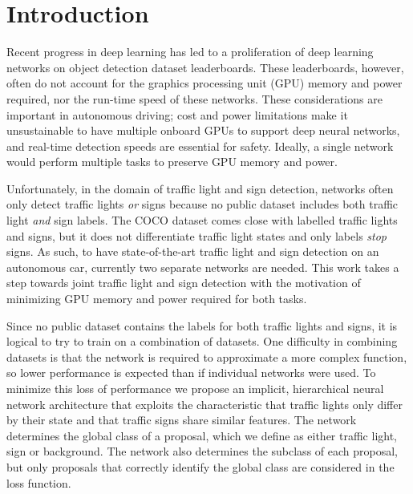 \documentclass[10pt, conference, compsocconf]{IEEEtran}
\begin{document}
\IEEEpeerreviewmaketitle

\section{Introduction} \label{introduction}

Recent progress in deep learning has led to a proliferation of deep learning networks on object detection dataset leaderboards. These leaderboards, however, often do not account for the graphics processing unit (GPU) memory and power required, nor the run-time speed of these networks. These considerations are important in autonomous driving; cost and power limitations make it unsustainable to have multiple onboard GPUs to support deep neural networks, and real-time detection speeds are essential for safety. Ideally, a single network would perform multiple tasks to preserve GPU memory and power.

Unfortunately, in the domain of traffic light and sign detection, networks often only detect traffic lights \textit{or} signs because no public dataset includes both traffic light \textit{and} sign labels. The COCO dataset \cite{COCO} comes close with labelled traffic lights and signs, but it does not differentiate traffic light states and only labels \textit{stop} signs. As such, to have state-of-the-art traffic light and sign detection on an autonomous car, currently two separate networks are needed. This work takes a step towards joint traffic light and sign detection with the motivation of minimizing GPU memory and power required for both tasks.

Since no public dataset contains the labels for both traffic lights and signs, it is logical to try to train on a combination of datasets. One difficulty in combining datasets is that the network is required to approximate a more complex function, so lower performance is expected than if individual networks were used. To minimize this loss of performance we propose an implicit, hierarchical neural network architecture that exploits the characteristic that traffic lights only differ by their state and that traffic signs share similar features. The network determines the global class of a proposal, which we define as either traffic light, sign or background. The network also determines the subclass of each proposal, but only proposals that correctly identify the global class are considered in the loss function. 
\end{document}
